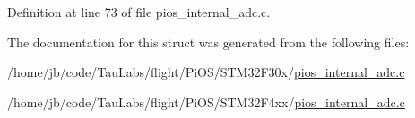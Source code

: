 \-Definition at line 73 of file pios\-\_\-internal\-\_\-adc.\-c.



\-The documentation for this struct was generated from the following files\-:\begin{DoxyCompactItemize}
\item 
/home/jb/code/\-Tau\-Labs/flight/\-Pi\-O\-S/\-S\-T\-M32\-F30x/\hyperlink{_s_t_m32_f30x_2pios__internal__adc_8c}{pios\-\_\-internal\-\_\-adc.\-c}\item 
/home/jb/code/\-Tau\-Labs/flight/\-Pi\-O\-S/\-S\-T\-M32\-F4xx/\hyperlink{_s_t_m32_f4xx_2pios__internal__adc_8c}{pios\-\_\-internal\-\_\-adc.\-c}\end{DoxyCompactItemize}
